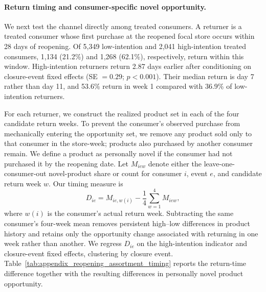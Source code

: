 \documentclass[11 pt]{article}
\begin{document}
\paragraph{Return timing and consumer-specific novel opportunity.}
We next test the channel directly among treated consumers. A returner is a treated consumer whose first purchase at the reopened focal store occurs within 28 days of reopening. Of 5,349 low-intention and 2,041 high-intention treated consumers, 1,134 (21.2\%) and 1,268 (62.1\%), respectively, return within this window. High-intention returners return 2.87 days earlier after conditioning on closure-event fixed effects (SE $=0.29$; $p<0.001$). Their median return is day 7 rather than day 11, and 53.6\% return in week 1 compared with 36.9\% of low-intention returners.

For each returner, we construct the realized product set in each of the four candidate return weeks. To prevent the consumer's observed purchase from mechanically entering the opportunity set, we remove any product sold only to that consumer in the store-week; products also purchased by another consumer remain. We define a product as personally novel if the consumer had not purchased it by the reopening date. Let $M_{iew}$ denote either the leave-one-consumer-out novel-product share or count for consumer $i$, event $e$, and candidate return week $w$. Our timing measure is
\begin{equation}
D_{ie}=M_{ie,w(i)}-\frac{1}{4}\sum_{w=1}^{4}M_{iew},
\label{eq:assortment_timing_exposure}
\end{equation}
where $w(i)$ is the consumer's actual return week. Subtracting the same consumer's four-week mean removes persistent high--low differences in product history and retains only the opportunity change associated with returning in one week rather than another. We regress $D_{ie}$ on the high-intention indicator and closure-event fixed effects, clustering by closure event. Table~\ref{tab:appendix_reopening_assortment_timing} reports the return-time difference together with the resulting differences in personally novel product opportunity.
\end{document}
